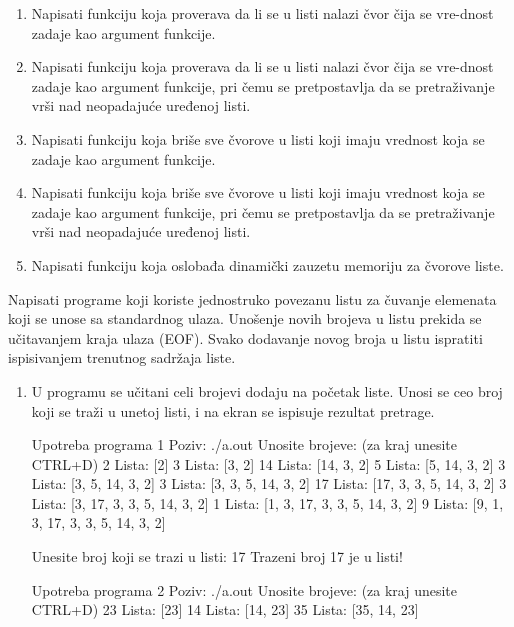 \begin{Exercise}[label=601]
\begin{enumerate}
 \item Napisati funkciju  koja proverava da li se u listi nalazi čvor čija se vre-dnost zadaje kao argument funkcije. 
 \item Napisati funkciju  koja proverava da li se u listi nalazi čvor čija se vre-dnost zadaje kao argument funkcije, pri čemu se pretpostavlja da se pretraživanje vrši nad neopadajuće uređenoj listi.
 \item Napisati funkciju  koja briše sve čvorove u listi koji imaju vrednost koja se zadaje kao argument funkcije.
 \item Napisati funkciju  koja briše sve čvorove u listi koji imaju vrednost koja se zadaje kao argument funkcije, pri čemu se pretpostavlja da se pretraživanje vrši nad neopadajuće uređenoj listi.
 \item Napisati funkciju  koja oslobađa dinamički zauzetu memoriju za čvorove liste.
 \end{enumerate}

Napisati programe koji koriste jednostruko povezanu listu za čuvanje elemenata koji se unose sa standardnog ulaza.  Unošenje novih brojeva u listu prekida se učitavanjem kraja ulaza (EOF). Svako dodavanje novog broja u listu ispratiti ispisivanjem trenutnog sadržaja liste. 

\begin{enumerate}
\item[(1)] U programu se učitani celi brojevi dodaju na početak liste. 
    Unosi se ceo broj koji se traži u unetoj listi, i na ekran se ispisuje rezultat pretrage. 

\begin{maxitest}
\begin{test}{Upotreba programa 1}
Poziv: ./a.out
Unosite brojeve: (za kraj unesite CTRL+D)
2
  Lista: [2]
3
  Lista: [3, 2]
14
  Lista: [14, 3, 2]
5
  Lista: [5, 14, 3, 2]
3
  Lista: [3, 5, 14, 3, 2]
3
  Lista: [3, 3, 5, 14, 3, 2]
17
  Lista: [17, 3, 3, 5, 14, 3, 2]
3
  Lista: [3, 17, 3, 3, 5, 14, 3, 2]
1
  Lista: [1, 3, 17, 3, 3, 5, 14, 3, 2]
9
  Lista: [9, 1, 3, 17, 3, 3, 5, 14, 3, 2]

Unesite broj koji se trazi u listi: 17
Trazeni broj 17 je u listi!
\end{test}
\end{maxitest}
\begin{maxitest}
\begin{test}{Upotreba programa 2}
Poziv: ./a.out
Unosite brojeve: (za kraj unesite CTRL+D)
23
  Lista: [23]
14
  Lista: [14, 23]
35
  Lista: [35, 14, 23]


\end{test}
\end{maxitest}
\end{enumerate}
\end{Exercise}
